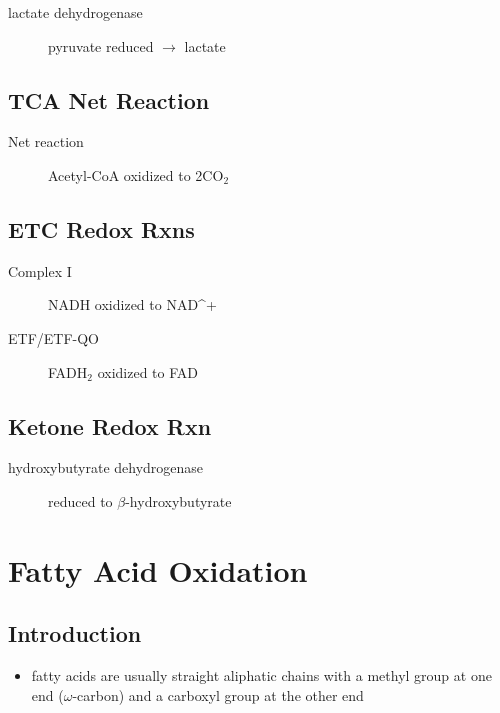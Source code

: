 \documentclass{scrartcl}
\begin{document}
\begin{description}
\item[{lactate dehydrogenase}] pyruvate reduced \(\to\) lactate
\end{description}


\subsection{TCA Net Reaction}
\label{sec:org7f7da69}
\begin{description}
\item[{Net reaction}] Acetyl-CoA oxidized to 2CO\(_{\text{2}}\)
\end{description}
{\tiny{}}

\subsection{ETC Redox Rxns}
\label{sec:org2b36efd}
\begin{description}
\item[{Complex I}] NADH oxidized to NAD\^{}+
\end{description}


\begin{description}
\item[{ETF/ETF-QO}] FADH\(_{\text{2}}\) oxidized to FAD

\end{description}


\subsection{Ketone Redox Rxn}
\label{sec:orge712acd}
\begin{description}
\item[{hydroxybutyrate dehydrogenase}] reduced to \(\beta\)-hydroxybutyrate

\end{description}

\section{Fatty Acid Oxidation}
\label{sec:org5ba0efc}
\subsection{Introduction}
\label{sec:orgaace974}
\begin{itemize}
\item fatty acids are usually straight aliphatic chains with a methyl
group at one end (\(\omega\)-carbon) and a carboxyl group at the other
end
\end{itemize}
\end{document}
